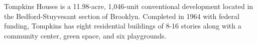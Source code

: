  

Tompkins Houses is a 11.98-acre, 1,046-unit conventional development located in the Bedford-Stuyvesant section of Brooklyn. Completed in 1964 with federal funding, Tompkins has eight residential buildings of 8-16 stories along with a community center, green space, and six playgrounds. 